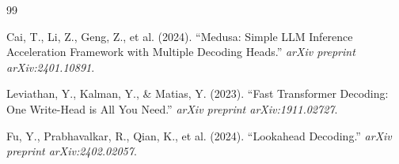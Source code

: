\documentclass[11pt,letterpaper]{article}
\begin{document}
\begin{thebibliography}{99}

  Cai, T., Li, Z., Geng, Z., et al. (2024).
  \newblock ``Medusa: Simple LLM Inference Acceleration Framework with Multiple Decoding Heads.''
  \newblock \textit{arXiv preprint arXiv:2401.10891}.

  Leviathan, Y., Kalman, Y., \& Matias, Y. (2023).
  \newblock ``Fast Transformer Decoding: One Write-Head is All You Need.''
  \newblock \textit{arXiv preprint arXiv:1911.02727}.

  Fu, Y., Prabhavalkar, R., Qian, K., et al. (2024).
  \newblock ``Lookahead Decoding.''
  \newblock \textit{arXiv preprint arXiv:2402.02057}.

\end{thebibliography}
\end{document}
